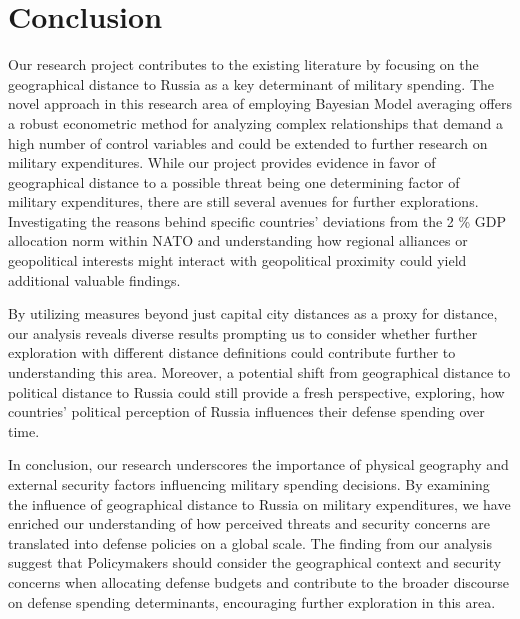 \documentclass[12pt,a4paper]{article}
\begin{document}
\section{Conclusion}
Our research project contributes to the existing literature by focusing on the geographical distance to Russia as a key determinant of military spending. The novel approach in this research area of employing Bayesian Model averaging offers a robust econometric method for analyzing complex relationships that demand a high number of control variables and could be extended to further research on military expenditures. 
While our project provides evidence in favor of geographical distance to a possible threat being one determining factor of military expenditures, there are still several avenues for further explorations. Investigating the reasons behind specific countries’ deviations from the 2 \% GDP allocation norm within NATO and understanding how regional alliances or geopolitical interests might interact with geopolitical proximity could yield additional valuable findings. 

By utilizing measures beyond just capital city distances as a proxy for distance, our analysis reveals diverse results prompting us to consider whether further exploration with different distance definitions could contribute further to understanding this area. Moreover, a potential shift from geographical distance to political distance to Russia could still provide a fresh perspective, exploring, how countries’ political perception of Russia influences their defense spending over time.

In conclusion, our research underscores the importance of physical geography and external security factors influencing military spending decisions. By examining the influence of geographical distance to Russia on military expenditures, we have enriched our understanding of how perceived threats and security concerns are translated into defense policies on a global scale. The finding from our analysis suggest that Policymakers should consider the geographical context and security concerns when allocating defense budgets and contribute to the broader discourse on defense spending determinants, encouraging further exploration in this area.  




\clearpage
{}
\setcounter{page}{\thesavepage}
\pagestyle{plain}


\end{document}
